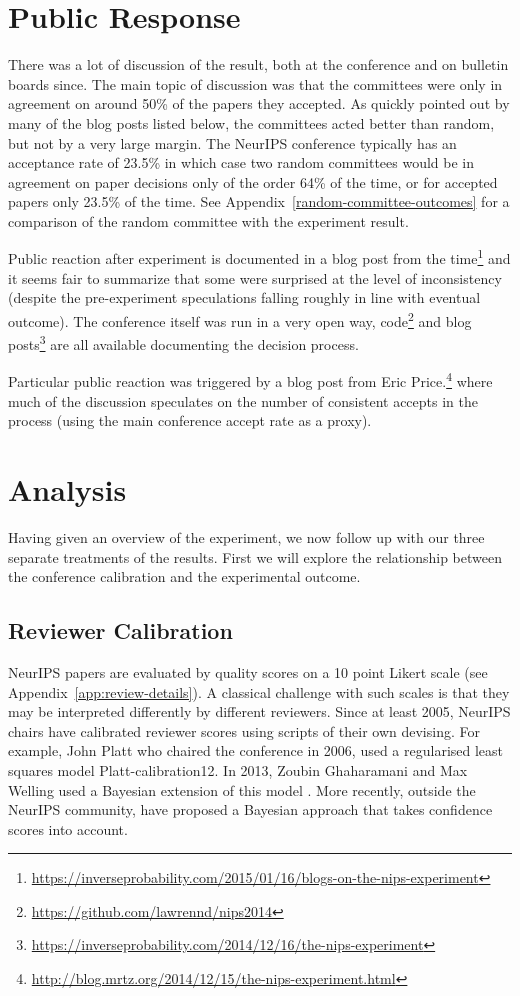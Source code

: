 \documentclass[twoside]{article}
\begin{document}
\section{Public Response}
There was a lot of discussion of the result, both at the
conference and on bulletin boards since. The main topic of discussion
was that the committees were only in agreement on around 50\% of the papers
they accepted. As quickly pointed out by many of the blog posts listed
below, the committees acted better than random, but not by a very large margin. The NeurIPS conference typically has an acceptance rate
of 23.5\% in which case two random committees would be in agreement on
paper decisions only of the order 64\% of the time, or for accepted papers only 
23.5\% of the time. See Appendix~\ref{random-committee-outcomes} for a comparison of the random committee with the experiment result.

Public reaction after experiment is documented in a blog post from the time\footnote{\url{https://inverseprobability.com/2015/01/16/blogs-on-the-nips-experiment}} and it seems fair to summarize that some were surprised at the level of inconsistency (despite the pre-experiment speculations falling roughly in line with eventual outcome). The conference itself was run in a very open way, code\footnote{\url{https://github.com/lawrennd/nips2014}} and blog
  posts\footnote{\url{https://inverseprobability.com/2014/12/16/the-nips-experiment}} are all available documenting the decision process.  

Particular public reaction was triggered by a blog post from Eric Price.\footnote{\url{http://blog.mrtz.org/2014/12/15/the-nips-experiment.html}} where much of the discussion speculates on the number of consistent accepts in
the process (using the main conference accept rate as a proxy). 

\section{Analysis}
Having given an overview of the experiment, we now follow up with our
three separate treatments of the results. First we will explore the
relationship between the conference calibration and the experimental
outcome.

\subsection{Reviewer Calibration}
\label{sec:calibration}
NeurIPS papers are evaluated by quality scores on a 10 point Likert
scale (see Appendix~\ref{app:review-details}). A
classical challenge with such scales is that they may be interpreted
differently by different reviewers. Since at least 2005, NeurIPS
chairs have calibrated reviewer scores using scripts of their
own devising. For example, John Platt who chaired the conference in
2006, used a regularised least squares model \citep{}{Platt-calibration12}. In 2013, Zoubin Ghaharamani
and Max Welling used a Bayesian extension of this model
\citep{Ge-bayesian15}. More recently, outside the NeurIPS community, \cite{MacKay-calibration17} have proposed a Bayesian approach that takes confidence scores into account. 
\end{document}

